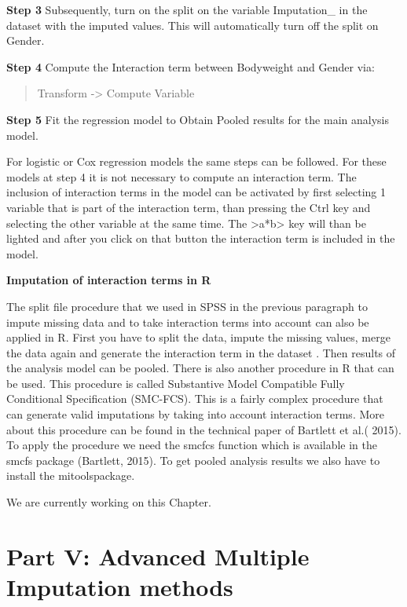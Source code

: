 \documentclass[
]{book}
\begin{document}
\textbf{Step 3}
Subsequently, turn on the split on the variable Imputation\_ in the dataset with the imputed values. This will automatically turn off the split on Gender.

\textbf{Step 4}
Compute the Interaction term between Bodyweight and Gender via:

\begin{quote}
Transform -\textgreater{} Compute Variable
\end{quote}

\textbf{Step 5}
Fit the regression model to Obtain Pooled results for the main analysis model.

For logistic or Cox regression models the same steps can be followed. For these models at step 4 it is not necessary to compute an interaction term. The inclusion of interaction terms in the model can be activated by first selecting 1 variable that is part of the interaction term, than pressing the Ctrl key and selecting the other variable at the same time. The \textgreater a*b\textgreater{} key will than be lighted and after you click on that button the interaction term is included in the model.

\textbf{Imputation of interaction terms in R}

The split file procedure that we used in SPSS in the previous paragraph to impute missing data and to take interaction terms into account can also be applied in R. First you have to split the data, impute the missing values, merge the data again and generate the interaction term in the dataset . Then results of the analysis model can be pooled.
There is also another procedure in R that can be used. This procedure is called Substantive Model Compatible Fully Conditional Specification (SMC-FCS). This is a fairly complex procedure that can generate valid imputations by taking into account interaction terms. More about this procedure can be found in the technical paper of Bartlett et al.( 2015). To apply the procedure we need the smcfcs function which is available in the smcfs package (Bartlett, 2015). To get pooled analysis results we also have to install the mitoolspackage.

We are currently working on this Chapter.

\hypertarget{part-part-v-advanced-multiple-imputation-methods}{%
\part{Part V: Advanced Multiple Imputation methods}\label{part-part-v-advanced-multiple-imputation-methods}}
\end{document}
